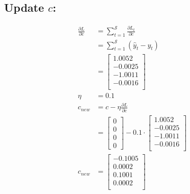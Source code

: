 \documentclass{article}
\begin{document}
\subsection{Update $c$:}
\begin{align*}
\frac{\partial L}{\partial c} &= \sum_{t=1}^{\mathcal{S}} \frac{\partial L_t}{\partial c} \\
 &=\sum_{t=1}^{\mathcal{S}} (\hat{y}_{t} - y_{t})\\
 &=\begin{bmatrix}
1.0052\\
-0.0025\\
-1.0011\\
-0.0016\\
\end{bmatrix} \\
\eta &= 0.1\\
c_{new} &= c - \eta \frac{\partial L}{\partial c}\\
 &= \begin{bmatrix}
    0 \\
    0 \\
    0 \\
    0
\end{bmatrix} - 0.1 \cdot \begin{bmatrix}
1.0052\\
-0.0025\\
-1.0011\\
-0.0016\\
\end{bmatrix} \\
c_{new} &= \begin{bmatrix}
-0.1005\\
0.0002\\
0.1001\\
0.0002\\
\end{bmatrix}
\end{align*}
\end{document}
